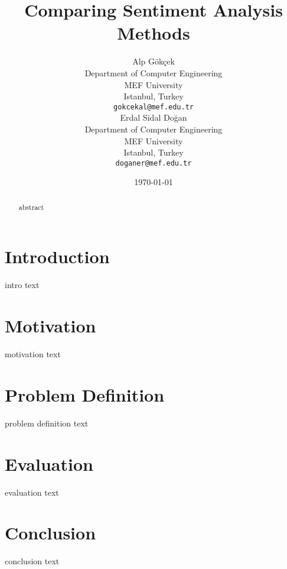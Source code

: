 \documentclass[11pt,a4paper]{article}
\title{Comparing Sentiment Analysis Methods}
\author{Alp Gökçek \\
  Department of Computer Engineering\\
  MEF University\\
  Istanbul, Turkey \\
  \texttt{gokcekal@mef.edu.tr} \\\And
  Erdal Sidal Doğan \\
  Department of Computer Engineering\\
  MEF University\\
  Istanbul, Turkey \\
  \texttt{doganer@mef.edu.tr} \\}
\date{\today}
\begin{document}
\maketitle
\begin{abstract}
abstract
\end{abstract}

\section{Introduction}
intro text


\section{Motivation}
motivation text

\section{Problem Definition}
problem definition text

\section{Evaluation}
evaluation text

\section{Conclusion}
conclusion text



\end{document}
